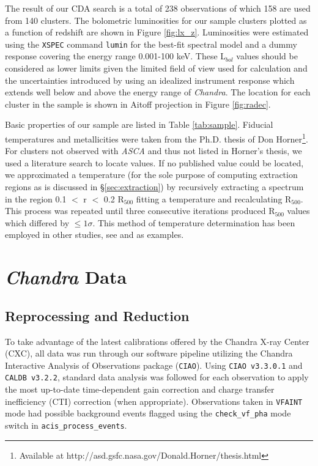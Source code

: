 \documentclass{emulateapj}
\begin{document}
The result of our CDA search is a total of 238 observations of which
158 are used from 140 clusters. The bolometric luminosities
for our sample clusters plotted as a function of
redshift are shown in Figure \ref{fig:lx_z}. Luminosities were
estimated using the {\tt XSPEC} command {\tt lumin} for the best-fit
spectral model and a dummy response covering the energy range
0.001-100 keV. These L$_{bol}$ values should be considered as lower
limits given the limited field of view used for calculation and the
uncertainties introduced by using an idealized instrument response
which extends well below and above the energy range of
{\textit{Chandra}}. The location for each cluster in the sample is
shown in Aitoff projection in Figure \ref{fig:radec}.

Basic properties of our sample are listed in Table
\ref{tab:sample}. Fiducial temperatures and metallicities were taken
from the Ph.D. thesis of Don Horner\footnote{Available at
http://asd.gsfc.nasa.gov/Donald.Horner/thesis.html}. For clusters not
observed with {\textit{ASCA}} and thus not listed in Horner's thesis,
we used a literature search to locate values. If no published value
could be located, we approximated a temperature (for the sole purpose
of computing extraction regions as is discussed in
\S\ref{sec:extraction}) by recursively extracting a spectrum in the
region 0.1 $<$ r $<$ 0.2 R$_{500}$ fitting a temperature and recalculating
R$_{500}$. This process was repeated until three consecutive
iterations produced R$_{500}$ values which differed by $\leq
1\sigma$. This method of temperature determination has been employed
in other studies, see \cite{2006MNRAS.tmp.1068S} and
\cite{2006ApJS..162..304H} as examples.

\section{\textit{Chandra} Data}\label{sec:data}

\subsection{Reprocessing and Reduction}\label{sec:reprocessing}

To take advantage of the latest calibrations offered by the Chandra
X-ray Center (CXC), all data was run through our software pipeline 
utilizing the Chandra Interactive Analysis of Observations package
({\tt CIAO}). Using {\tt CIAO v3.3.0.1} and {\tt CALDB v3.2.2}, standard data
analysis was followed for each observation to apply the most up-to-date
time-dependent gain correction and charge transfer inefficiency (CTI) correction (when
appropriate)\citep{2000ApJ...534L.139T}. Observations taken in {\tt VFAINT}
mode had possible background events flagged using the {\tt check\_vf\_pha}
mode switch in {\tt acis\_process\_events}.
\end{document}
